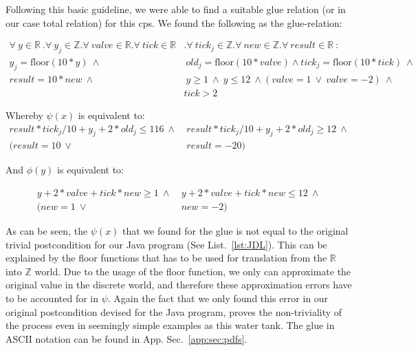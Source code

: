 Following this basic guideline, we were able to find a suitable glue relation (or in our case total relation) for this cps. We found the following as the glue-relation:

\begin{equation}
	\begin{split}
		\forall~y \in \mathbb{R}~. \forall~y_j \in \mathbb{Z}. \forall~valve \in \mathbb{R}. \forall~tick \in \mathbb{R}&. \forall~tick_j \in \mathbb{Z} . \forall~new \in \mathbb{Z}. \forall~result \in \mathbb{R}~: \\  y_j = \textrm{floor}(10 * y)~\wedge&~ old_j = \textrm{floor}(10*valve) \wedge tick_j = \textrm{floor}(10*tick)~\wedge \\ result = 10 * new~\wedge&~ y \geq 1~\wedge~y \leq 12~\wedge  (valve = 1 ~\vee~valve = -2)~\wedge \\&tick > 2 
	\end{split}
	\label{eq:glueWatertank}
\end{equation}

Whereby \(\psi(x)\) is equivalent to:
\begin{equation}
	\begin{split}
		result * tick_j/10 + y_j + 2 * old_j \leq 116~\wedge&~result * tick_j/10 + y_j + 2 * old_j \geq 12~\wedge \\ (result = 10~\vee&~result = -20)
	\end{split}
	\label{eq:psiWatertank}
\end{equation}

And \(\phi(y)\) is equivalent to:

\begin{equation}
	\begin{split}
		 y + 2 * valve + tick * new \geq 1~\wedge&~y + 2 * valve + tick * new \leq 12~\wedge \\ (new = 1~\vee&~new = -2)
	\end{split}
	\label{eq:phiWatertank}
\end{equation}

As can be seen, the \(\psi(x)\) that we found for the glue is not equal to the original trivial postcondition for our Java program (See List.~\ref{lst:JDL}). This can be explained by the floor functions that has to be used for translation from the \(\mathbb{R}\) into \(\mathbb{Z}\) world. Due to the usage of the floor function, we only can approximate the original value in the discrete world, and therefore these approximation errors have to be accounted for in \(\psi\). Again the fact that we only found this error in our original postcondition devised for the Java program, proves the non-triviality of the process even in seemingly simple examples as this water tank. The glue in ASCII notation can be found in App. Sec.~\ref{app:sec:pdfs}.

